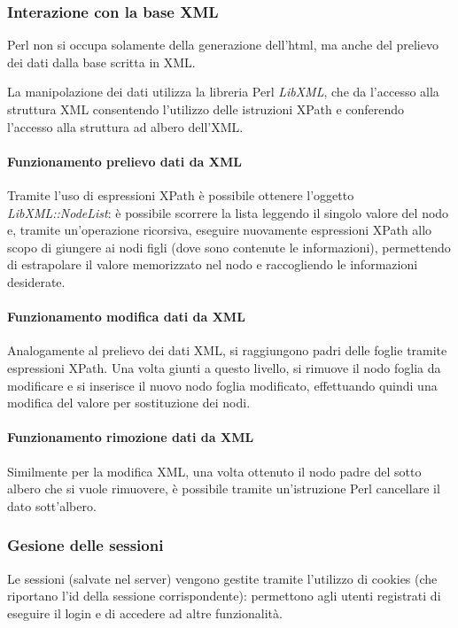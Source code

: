 \subsubsection{Interazione con la base XML}
Perl non si occupa solamente della generazione dell'html, ma anche del prelievo dei dati dalla base scritta in XML.

La manipolazione dei dati utilizza la libreria Perl \textit{LibXML}, che da l'accesso alla struttura XML consentendo l'utilizzo delle istruzioni XPath e conferendo l'accesso alla struttura ad albero dell'XML.

\paragraph*{Funzionamento prelievo dati da XML}Tramite l'uso di espressioni XPath \`e possibile ottenere l'oggetto \textit{LibXML::NodeList}: \`e possibile scorrere la lista leggendo il singolo valore del nodo e, tramite un'operazione ricorsiva, eseguire nuovamente espressioni XPath allo scopo di giungere ai nodi figli (dove sono contenute le informazioni), permettendo di estrapolare il valore memorizzato nel nodo e raccogliendo le informazioni desiderate.

\paragraph*{Funzionamento modifica dati da XML}Analogamente al prelievo dei dati XML, si raggiungono padri delle foglie tramite espressioni XPath. Una volta giunti a questo livello, si rimuove il nodo foglia da modificare e si inserisce il nuovo nodo foglia modificato, effettuando quindi una modifica del valore per sostituzione dei nodi.

\paragraph*{Funzionamento rimozione dati da XML}Similmente per la modifica XML, una volta ottenuto il nodo padre del sotto albero che si vuole rimuovere, \`e possibile tramite un'istruzione Perl cancellare il dato sott'albero.

\subsubsection{Gesione delle sessioni}
Le sessioni (salvate nel server) vengono gestite tramite l'utilizzo di cookies (che riportano l'id della sessione corrispondente): permettono agli utenti registrati di eseguire il login e di accedere ad altre funzionalit\`a.
